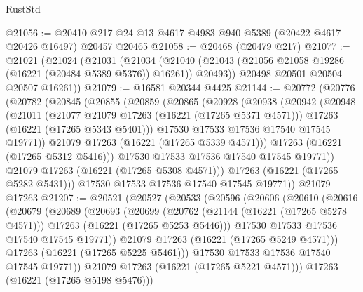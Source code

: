 \begin{lexlean}{RustStd}
\begin{coremodule}
@21056 := @20410 @217 @24 @13 @4617 @4983 @940 @5389 (@20422 @4617 @20426 @16497) @20457 @20465
@21058 := @20468 (@20479 @217)
@21077 := @21021
    (@21024
      (@21031
        (@21034
          (@21040 (@21043 (@21056 @21058 @19286 (@16221 (@20484 @5389 @5376)) @16261)) @20493))
        @20498
        @20501
        @20504
        @20507
        @16261))
@21079 := @16581 @20344 @4425
@21144 := @20772
    (@20776
      (@20782
        (@20845
          (@20855
            (@20859
              (@20865
                (@20928
                  (@20938
                    (@20942
                      (@20948
                        (@21011
                          (@21077 @21079 @17263 (@16221 (@17265 @5371 @4571)))
                          @17263
                          (@16221 (@17265 @5343 @5401)))
                        @17530
                        @17533
                        @17536
                        @17540
                        @17545
                        @19771))
                    @21079
                    @17263
                    (@16221 (@17265 @5339 @4571)))
                  @17263
                  (@16221 (@17265 @5312 @5416)))
                @17530
                @17533
                @17536
                @17540
                @17545
                @19771))
            @21079
            @17263
            (@16221 (@17265 @5308 @4571)))
          @17263
          (@16221 (@17265 @5282 @5431)))
        @17530
        @17533
        @17536
        @17540
        @17545
        @19771))
    @21079
    @17263
@21207 := @20521
    (@20527
      (@20533
        (@20596
          (@20606
            (@20610
              (@20616
                (@20679
                  (@20689
                    (@20693
                      (@20699
                        (@20762
                          (@21144 (@16221 (@17265 @5278 @4571)))
                          @17263
                          (@16221 (@17265 @5253 @5446)))
                        @17530
                        @17533
                        @17536
                        @17540
                        @17545
                        @19771))
                    @21079
                    @17263
                    (@16221 (@17265 @5249 @4571)))
                  @17263
                  (@16221 (@17265 @5225 @5461)))
                @17530
                @17533
                @17536
                @17540
                @17545
                @19771))
            @21079
            @17263
            (@16221 (@17265 @5221 @4571)))
          @17263
          (@16221 (@17265 @5198 @5476)))

\end{coremodule}
\end{lexlean}
